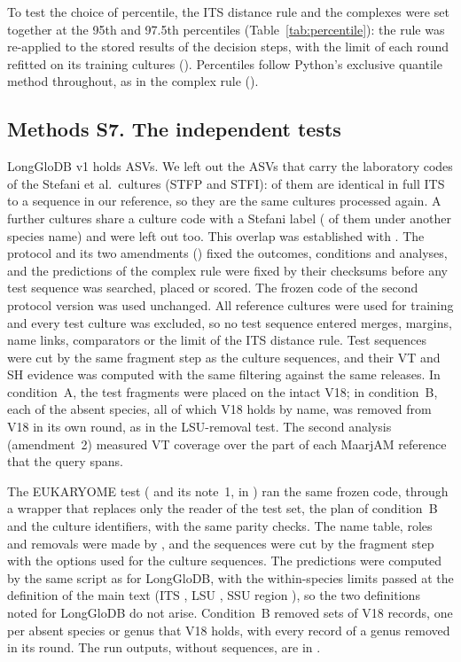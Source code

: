 \documentclass[11pt]{article}
\begin{document}
To test the choice of percentile, the ITS distance rule and the complexes were set together at the 95th and 97.5th
percentiles (Table~\ref{tab:percentile}): the rule was re-applied to the stored results of the decision steps, with
the limit of each round refitted on its training cultures (). Percentiles follow
Python's exclusive quantile method throughout, as in the complex rule ().

\subsection*{Methods S7. The independent tests}
LongGloDB v1 holds \LgTotal{} ASVs. We left out the \LgStefani{} ASVs that carry the laboratory codes of the Stefani
et al.\ cultures (STFP and STFI): \LgStefaniIdentical{} of them are identical in full ITS to a sequence in our
reference, so they are the same cultures processed again. A further \LgCodeShared{} cultures share a culture code
with a Stefani label (\LgCodeConflicts{} of them under another species name) and were left out too. This overlap was
established with . The protocol and its two amendments () fixed the
outcomes, conditions and analyses, and the predictions of the complex rule were fixed by their checksums before any
test sequence was searched, placed or scored. The frozen code of the second protocol version was used unchanged. All
\NCultures{} reference cultures were used for training and every test culture was excluded, so no test sequence
entered merges, margins, name links, comparators or the limit of the ITS distance rule. Test sequences were cut by
the same fragment step as the culture sequences, and their VT and SH evidence was computed with the same filtering
against the same releases. In condition~A, the test fragments were placed on the intact V18; in condition~B, each of
the \LgFolds{} absent species, all of which V18 holds by name, was removed from V18 in its own round, as in the
LSU-removal test. The second analysis (amendment~2) measured VT coverage over the part of each MaarjAM reference that
the query spans.

The EUKARYOME test ( and its note~1, in ) ran the same frozen code,
through a wrapper that replaces only the reader of the test set, the plan of condition~B and the culture identifiers,
with the same parity checks. The name table, roles and removals were made by , and the
sequences were cut by the fragment step with the options used for the culture sequences. The predictions were
computed by the same script as for LongGloDB, with the within-species limits passed at the definition of the main
text (ITS \EkTITS{}, LSU \EkTLSU{}, SSU region \EkTSSU{}), so the two definitions noted for LongGloDB do not arise.
Condition~B removed \EkRounds{} sets of V18 records, one per absent species or genus that V18 holds, with every record
of a genus removed in its round.
The run outputs, without sequences, are in .
\end{document}
